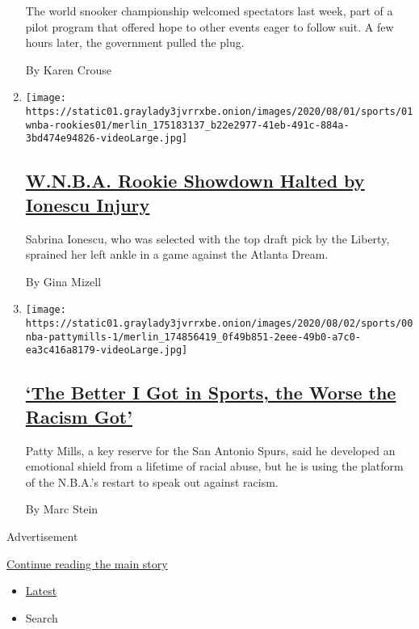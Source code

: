 \begin{enumerate}
  The world snooker championship welcomed spectators last week, part of
  a pilot program that offered hope to other events eager to follow
  suit. A few hours later, the government pulled the plug.

  By Karen Crouse
\item
  \texttt{[image: https://static01.graylady3jvrrxbe.onion/images/2020/08/01/sports/01wnba-rookies01/merlin\_175183137\_b22e2977-41eb-491c-884a-3bd474e94826-videoLarge.jpg]}

  \hypertarget{wnba-rookie-showdown-halted-by-ionescu-injury}{%
  \subsection{\texorpdfstring{\href{/2020/08/01/sports/basketball/sabrina-ionescu-injury.html}{W.N.B.A.
  Rookie Showdown Halted by Ionescu
  Injury}}{W.N.B.A. Rookie Showdown Halted by Ionescu Injury}}\label{wnba-rookie-showdown-halted-by-ionescu-injury}}

  Sabrina Ionescu, who was selected with the top draft pick by the
  Liberty, sprained her left ankle in a game against the Atlanta Dream.

  By Gina Mizell
\item
  \texttt{[image: https://static01.graylady3jvrrxbe.onion/images/2020/08/02/sports/00nba-pattymills-1/merlin\_174856419\_0f49b851-2eee-49b0-a7c0-ea3c416a8179-videoLarge.jpg]}

  \hypertarget{the-better-i-got-in-sports-the-worse-the-racism-got}{%
  \subsection{\texorpdfstring{\href{/2020/07/31/sports/basketball/spurs-patty-mills.html}{`The
  Better I Got in Sports, the Worse the Racism
  Got'}}{`The Better I Got in Sports, the Worse the Racism Got'}}\label{the-better-i-got-in-sports-the-worse-the-racism-got}}

  Patty Mills, a key reserve for the San Antonio Spurs, said he
  developed an emotional shield from a lifetime of racial abuse, but he
  is using the platform of the N.B.A.'s restart to speak out against
  racism.

  By Marc Stein
\end{enumerate}

Advertisement

\protect\hyperlink{after-mid1}{Continue reading the main story}

\begin{itemize}
\tightlist
\item
  \protect\hyperlink{stream-panel}{Latest}
\item
  Search
\end{itemize}

